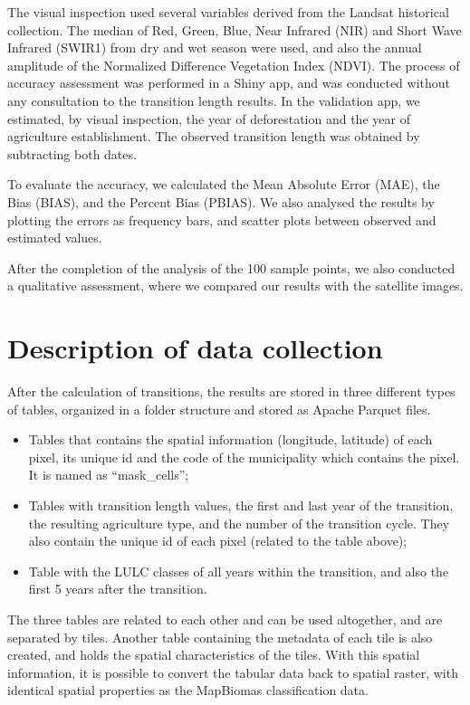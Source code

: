 \documentclass[essd, manuscript]{copernicus}
\begin{document}
The visual inspection used several variables derived from the Landsat historical collection.
The median of Red, Green, Blue, Near Infrared (NIR) and Short Wave Infrared (SWIR1) from dry and wet season were used, and also the annual amplitude of the Normalized Difference Vegetation Index (NDVI).
The process of accuracy assessment was performed in a Shiny app, and was conducted without any consultation to the transition length results.
In the validation app, we estimated, by visual inspection, the year of deforestation and the year of agriculture establishment.
The observed transition length was obtained by subtracting both dates.

To evaluate the accuracy, we calculated the Mean Absolute Error (MAE), the Bias (BIAS), and the Percent Bias (PBIAS).
We also analysed the results by plotting the errors as frequency bars, and scatter plots between observed and estimated values.

After the completion of the analysis of the 100 sample points, we also conducted a qualitative assessment, where we compared our results with the satellite images.

\section{Description of data collection}

After the calculation of transitions, the results are stored in three different types of tables, organized in a folder structure and stored as Apache Parquet files.

\begin{itemize}
\item
  Tables that contains the spatial information (longitude, latitude) of each pixel, its unique id and the code of the municipality which contains the pixel.
  It is named as ``mask\_cells'';
\item
  Tables with transition length values, the first and last year of the transition, the resulting agriculture type, and the number of the transition cycle.
  They also contain the unique id of each pixel (related to the table above);
\item
  Table with the LULC classes of all years within the transition, and also the first 5 years after the transition.
\end{itemize}

The three tables are related to each other and can be used altogether, and are separated by tiles.
Another table containing the metadata of each tile is also created, and holds the spatial characteristics of the tiles.
With this spatial information, it is possible to convert the tabular data back to spatial raster, with identical spatial properties as the MapBiomas classification data.
\end{document}
